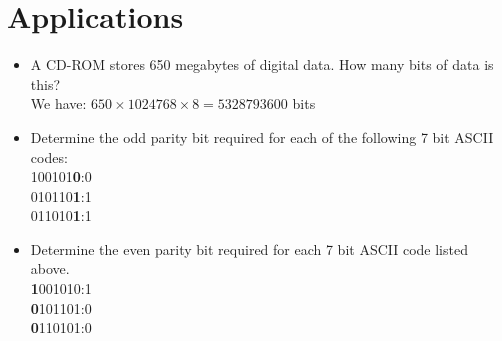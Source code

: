\documentclass[12pt]{article}
\begin{document}
\section*{Applications}
\begin{itemize}
	\item A CD-ROM stores 650 megabytes of digital data. How many bits of data is this?\\
	 We have: $650 \times 1024768 \times 8 = 5328793600$ bits
	\item Determine the odd parity bit required for each of the following 7 bit ASCII codes:\\
	  100101\textbf{0}:0 \\
	  010110\textbf{1}:1 \\
	  011010\textbf{1}:1 
	\item Determine the even parity bit required for each 7 bit ASCII code listed above.\\
	 \textbf{1}001010:1 \\
	 \textbf{0}101101:0 \\
	 \textbf{0}110101:0 
\end{itemize}
\end{document}

